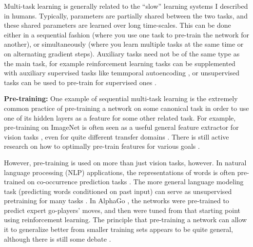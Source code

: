 \documentclass[11pt]{article}
\begin{document}
Multi-task learning is generally related to the ``slow'' learning systems I described in humans. Typically, parameters are partially shared between the two tasks, and these shared parameters are learned over long time-scales. This can be done either in a sequential fashion (where you use one task to pre-train the network for another), or simultaneously (where you learn multiple tasks at the same time or on alternating gradient steps). Auxiliary tasks need not be of the same type as the main task, for example reinforcement learning tasks can be supplemented with auxiliary supervised tasks like temmporal autoencoding \citep[e.g.]{Hermann2017}, or unsupervised tasks can be used to pre-train for supervised ones \citep[e.g.]{Wu2018}. \par
\textbf{Pre-training:} One example of sequential multi-task learning is the extremely common practice of pre-training a network on some canonical task in order to use one of its hidden layers as a feature for some other related task. For example, pre-training on ImageNet \citep{Deng2009} is often seen as a useful general feature extractor for vision tasks \citep{Huh2016}, even for quite different transfer domains \citep[e.g.]{Marmanis2016}. There is still active research on how to optimally pre-train features for various goals \citep[e.g.]{Wu2018}. \par    
However, pre-training is used on more than just vision tasks, however. In natural language processing (NLP) applications, the representations of words is often pre-trained on co-occurrence prediction tasks \citep[e.g.]{Pennington2014}. The more general language modeling task (predicting words conditioned on past input) can serve as unsupervised pretraining for many tasks \citep[e.g.]{Radford2019}. In AlphaGo \citep{Silver2016}, the networks were pre-trained to predict expert go-players' moves, and then were tuned from that starting point using reinforcement learning. The principle that pre-training a network can allow it to generalize better from smaller training sets appears to be quite general, although there is still some debate \citep[e.g]{He2018}. \par
\end{document}
